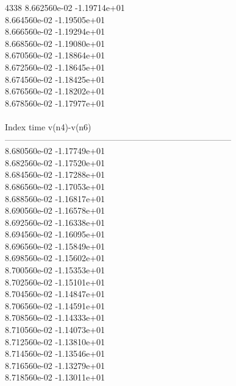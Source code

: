 4338	8.662560e-02	-1.19714e+01	\\ 	8.664560e-02	-1.19505e+01	\\ 	8.666560e-02	-1.19294e+01	\\ 	8.668560e-02	-1.19080e+01	\\ 	8.670560e-02	-1.18864e+01	\\ 	8.672560e-02	-1.18645e+01	\\ 	8.674560e-02	-1.18425e+01	\\ 	8.676560e-02	-1.18202e+01	\\ 	8.678560e-02	-1.17977e+01	\\ \hline
\\ \hline
Index   time            v(n4)-v(n6)     \\ \hline
--------------------------------------------------------------------------------\\ 	8.680560e-02	-1.17749e+01	\\ 	8.682560e-02	-1.17520e+01	\\ 	8.684560e-02	-1.17288e+01	\\ 	8.686560e-02	-1.17053e+01	\\ 	8.688560e-02	-1.16817e+01	\\ 	8.690560e-02	-1.16578e+01	\\ 	8.692560e-02	-1.16338e+01	\\ 	8.694560e-02	-1.16095e+01	\\ 	8.696560e-02	-1.15849e+01	\\ 	8.698560e-02	-1.15602e+01	\\ 	8.700560e-02	-1.15353e+01	\\ 	8.702560e-02	-1.15101e+01	\\ 	8.704560e-02	-1.14847e+01	\\ 	8.706560e-02	-1.14591e+01	\\ 	8.708560e-02	-1.14333e+01	\\ 	8.710560e-02	-1.14073e+01	\\ 	8.712560e-02	-1.13810e+01	\\ 	8.714560e-02	-1.13546e+01	\\ 	8.716560e-02	-1.13279e+01	\\ 	8.718560e-02	-1.13011e+01	\\ \hline
